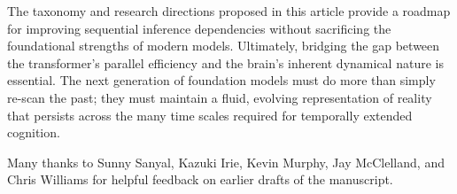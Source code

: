 \documentclass{article}
\begin{document}
The taxonomy and research directions proposed in this article provide a roadmap 
for improving sequential inference dependencies without sacrificing the 
foundational strengths of modern models. Ultimately, bridging the gap between 
the transformer's parallel efficiency and the brain's inherent dynamical nature 
is essential. The next generation of foundation models must do more than simply 
re-scan the past; they must maintain a fluid, evolving representation of reality 
that persists across the many time scales required for temporally extended cognition.
\begin{ack}
Many thanks to Sunny Sanyal, Kazuki Irie, Kevin Murphy, Jay McClelland, and Chris Williams for helpful feedback on earlier drafts of the manuscript.
\end{ack}
\newpage

\end{document}
